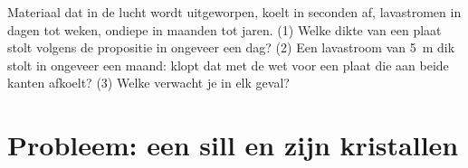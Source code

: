 \begin{exercise}[$\star\star\star$]\label{exo:g11:igneous-rocks:15}
Materiaal dat in de lucht wordt uitgeworpen, koelt in seconden af, lavastromen in dagen tot weken,
ondiepe  in maanden tot jaren. (1) Welke dikte van een plaat stolt
volgens de propositie in ongeveer een dag? (2) Een lavastroom van \qty{5}{m}
dik stolt in ongeveer een maand: klopt dat met de wet voor een
plaat die aan beide kanten afkoelt? (3) Welke  verwacht je in elk geval?
\end{exercise}

\section{Probleem: een sill en zijn kristallen}

